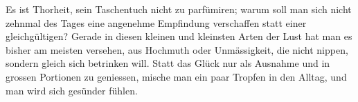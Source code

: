 Es ist Thorheit, sein Taschentuch nicht zu parfümiren; warum soll man sich nicht zehnmal des Tages eine angenehme Empfindung verschaffen statt einer gleichgültigen? Gerade in diesen kleinen und kleinsten Arten der Lust hat man es bisher am meisten versehen, aus Hochmuth oder Unmässigkeit, die nicht nippen, sondern gleich sich betrinken will. Statt das Glück nur als Ausnahme und in grossen Portionen zu geniessen, mische man ein paar Tropfen in den Alltag, und man wird sich gesünder fühlen.
\par

